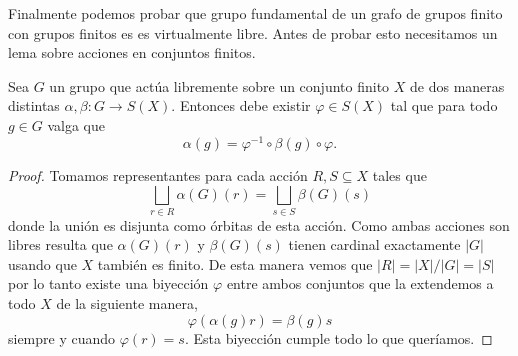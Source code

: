 \documentclass[tesis.tex]{subfiles}
\newcommand{\fg}{grupo finitamente generado }
\begin{document}
%

Finalmente podemos probar que grupo fundamental de un grafo de grupos finito con grupos finitos es es virtualmente libre. 
Antes de probar esto necesitamos un lema sobre acciones en conjuntos finitos.

\begin{lema}\label{lema_acciones_finitas}
	Sea $G$ un grupo que actúa libremente sobre un conjunto finito $X$ de dos maneras distintas $\alpha, \beta : G \to S(X)$. 
	Entonces debe existir $\varphi \in S(X)$ tal que para todo $g \in G$ valga que 
	\[
	\alpha (g) = \varphi^{-1} \circ \beta(g) \circ \varphi.
	\]
\end{lema}
\begin{proof}
	Tomamos representantes para cada acción $R,S \subseteq X$ tales que
	\[
		\bigsqcup_{r \in R} \alpha(G) (r) = \bigsqcup_{s \in S} \beta(G) (s)
	\]
	donde la unión es disjunta como órbitas de esta acción. 
	Como ambas acciones son libres resulta que $\alpha(G)(r)$ y $\beta(G)(s)$ tienen cardinal exactamente $|G|$ usando que $X$ también es finito.
	De esta manera vemos que $|R| = |X| / |G| = |S|$ por lo tanto existe una biyección $\varphi$ entre ambos conjuntos que la extendemos a todo $X$ de la siguiente manera,
	\[
		\varphi (\alpha(g) r) = \beta(g)  s
	\]
	siempre y cuando $\varphi(r) = s$. 
	Esta biyección cumple todo lo que queríamos.
\end{proof}
\end{document}
